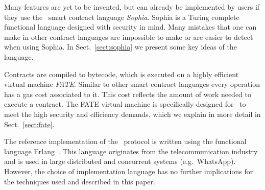 Many features are yet to be invented, but can already be implemented
by users if they use the \aet\ smart contract language
\textit{Sophia}. Sophia is a Turing complete functional language
designed with security in mind. Many mistakes that one can make in
other contract languages are impossible to make or are easier to detect
when using Sophia. In Sect.\ \ref{sect:sophia} we present some key
ideas of the language.

Contracts are compiled to bytecode, which is executed on a highly
efficient virtual machine \textit{FATE}. Similar to other smart contract
languages every operation has a gas cost associated to it. This cost reflects
the amount of work needed to execute a contract. The FATE virtual machine is
specifically designed for
\aet\ to meet the high security and efficiency demands, which we
explain in more detail in Sect.~\ref{sect:fate}.

The reference implementation of the \aet\ protocol is written using the
functional language Erlang~\cite{Armstrong:2010:ERL:1810891.1810910}. This
language originates from the telecommunication industry and is used in large
distributed and concurrent systems (e.g.\ WhatsApp). However, the choice
of implementation language has no further implications for the techniques used
and described in this paper.
